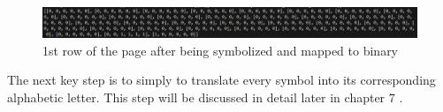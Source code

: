 \begin{figure}[H]
    \begin{adjustwidth}{-2.5cm}{}
        \centering
        \includegraphics[width=1.12\linewidth]{Hough/image1.png}
    \end{adjustwidth}
    \caption{1st row of the page after being symbolized and mapped to binary}
    \label{fig:num6}
\end{figure}

The next key step is to simply to translate every symbol into its corresponding alphabetic letter. This step will be discussed in detail later in chapter 7 .